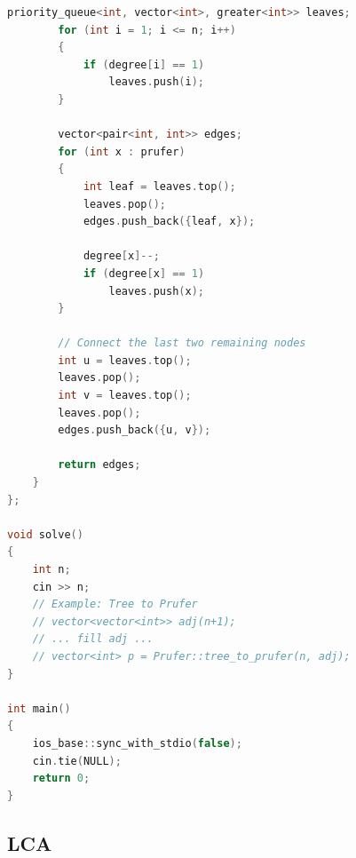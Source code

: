 \documentclass[10pt,landscape,a4paper,twocolumn]{article}
\begin{document}
\begin{lstlisting}[language=C++]
        priority_queue<int, vector<int>, greater<int>> leaves;
        for (int i = 1; i <= n; i++)
        {
            if (degree[i] == 1)
                leaves.push(i);
        }

        vector<pair<int, int>> edges;
        for (int x : prufer)
        {
            int leaf = leaves.top();
            leaves.pop();
            edges.push_back({leaf, x});

            degree[x]--;
            if (degree[x] == 1)
                leaves.push(x);
        }

        // Connect the last two remaining nodes
        int u = leaves.top();
        leaves.pop();
        int v = leaves.top();
        leaves.pop();
        edges.push_back({u, v});

        return edges;
    }
};

void solve()
{
    int n;
    cin >> n;
    // Example: Tree to Prufer
    // vector<vector<int>> adj(n+1);
    // ... fill adj ...
    // vector<int> p = Prufer::tree_to_prufer(n, adj);
}

int main()
{
    ios_base::sync_with_stdio(false);
    cin.tie(NULL);
    return 0;
}
\end{lstlisting}
\subsection{LCA}
\end{document}
